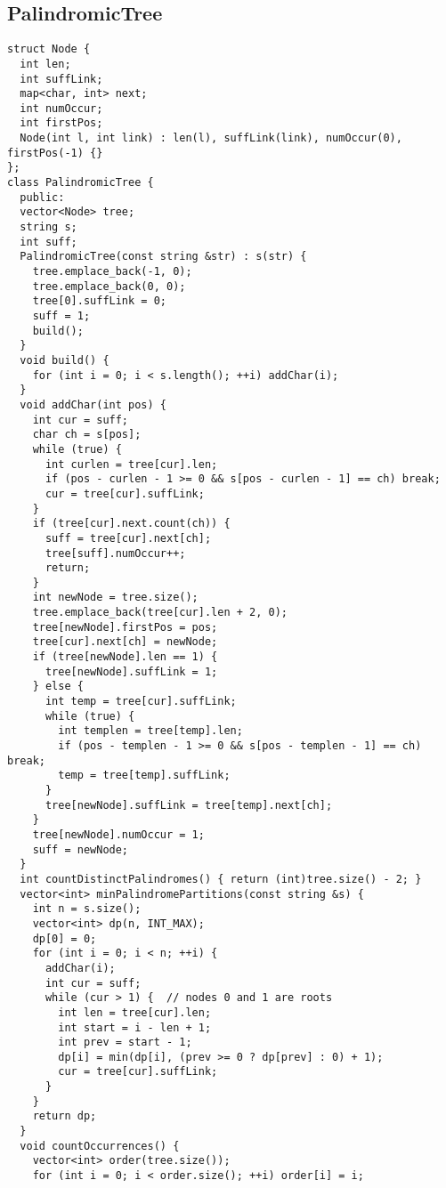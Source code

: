 \documentclass[twoside]{article}
\begin{document}
\begin{multicols*}{2}
{
\subsection*{PalindromicTree}
}
\begin{verbatim}
struct Node {
  int len;
  int suffLink;
  map<char, int> next;
  int numOccur;
  int firstPos;
  Node(int l, int link) : len(l), suffLink(link), numOccur(0), firstPos(-1) {}
};
class PalindromicTree {
  public:
  vector<Node> tree;
  string s;
  int suff;
  PalindromicTree(const string &str) : s(str) {
    tree.emplace_back(-1, 0);
    tree.emplace_back(0, 0);
    tree[0].suffLink = 0;
    suff = 1;
    build();
  }
  void build() {
    for (int i = 0; i < s.length(); ++i) addChar(i);
  }
  void addChar(int pos) {
    int cur = suff;
    char ch = s[pos];
    while (true) {
      int curlen = tree[cur].len;
      if (pos - curlen - 1 >= 0 && s[pos - curlen - 1] == ch) break;
      cur = tree[cur].suffLink;
    }
    if (tree[cur].next.count(ch)) {
      suff = tree[cur].next[ch];
      tree[suff].numOccur++;
      return;
    }
    int newNode = tree.size();
    tree.emplace_back(tree[cur].len + 2, 0);
    tree[newNode].firstPos = pos;
    tree[cur].next[ch] = newNode;
    if (tree[newNode].len == 1) {
      tree[newNode].suffLink = 1;
    } else {
      int temp = tree[cur].suffLink;
      while (true) {
        int templen = tree[temp].len;
        if (pos - templen - 1 >= 0 && s[pos - templen - 1] == ch) break;
        temp = tree[temp].suffLink;
      }
      tree[newNode].suffLink = tree[temp].next[ch];
    }
    tree[newNode].numOccur = 1;
    suff = newNode;
  }
  int countDistinctPalindromes() { return (int)tree.size() - 2; }
  vector<int> minPalindromePartitions(const string &s) {
    int n = s.size();
    vector<int> dp(n, INT_MAX);
    dp[0] = 0;
    for (int i = 0; i < n; ++i) {
      addChar(i);
      int cur = suff;
      while (cur > 1) {  // nodes 0 and 1 are roots
        int len = tree[cur].len;
        int start = i - len + 1;
        int prev = start - 1;
        dp[i] = min(dp[i], (prev >= 0 ? dp[prev] : 0) + 1);
        cur = tree[cur].suffLink;
      }
    }
    return dp;
  }
  void countOccurrences() {
    vector<int> order(tree.size());
    for (int i = 0; i < order.size(); ++i) order[i] = i;

\end{verbatim}
\end{multicols*}
\end{document}
